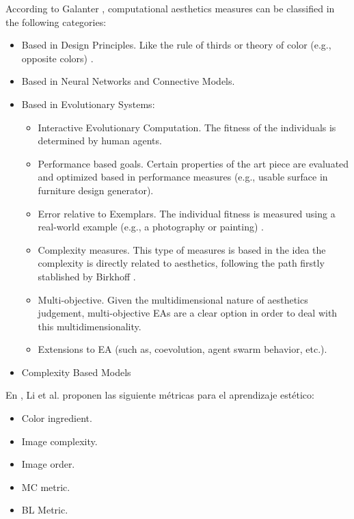 \documentclass{llncs}
\begin{document}
According to Galanter \cite{galanter2012computational}, computational aesthetics measures can be classified in the following categories:
\begin{itemize}
	\item Based in Design Principles. Like the rule of thirds or theory of color (e.g., opposite colors) \cite{den2012evolving}.
	\item Based in Neural Networks and Connective Models. 
	\item Based in Evolutionary Systems:
		\begin{itemize}
			\item Interactive Evolutionary Computation. The fitness of the individuals is determined by human agents.
			\item Performance based goals. Certain properties of the art piece are evaluated and optimized based in performance measures (e.g., usable surface in furniture design generator). %
			\item Error relative to Exemplars. The individual fitness is measured using a real-world example (e.g., a photography or painting) \cite{dipaola2009incorporating}.
			\item Complexity measures. This type of measures is based in the idea the complexity is directly related to aesthetics, following the path firstly stablished by Birkhoff \cite{Birkhoff:1933fk}.
			\item Multi-objective. Given the multidimensional nature of aesthetics judgement, multi-objective EAs are a clear option in order to deal with this multidimensionality.
			\item Extensions to EA (such as, coevolution, agent swarm behavior, etc.).
		\end{itemize}
	\item Complexity Based Models
\end{itemize}

En \cite{li2012investigating}, Li et al. proponen las siguiente métricas para el aprendizaje estético:
\begin{itemize}
	\item Color ingredient.
	\item Image complexity.
	\item Image order.
	\item MC metric.
	\item BL Metric.
\end{itemize}
\end{document}
